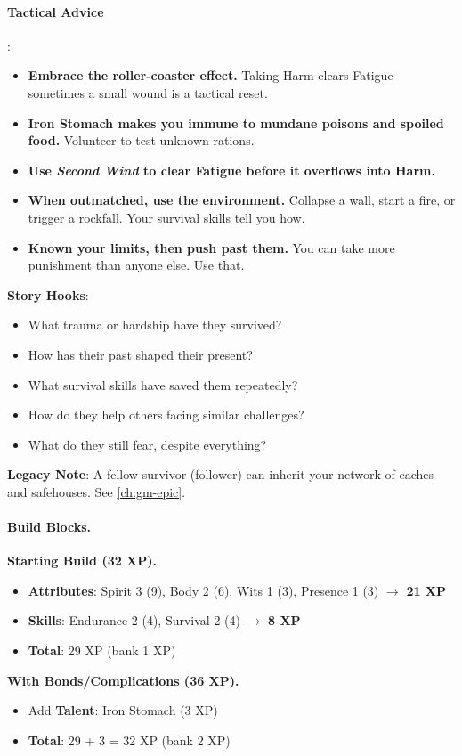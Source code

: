 \paragraph{Tactical Advice}:
\begin{itemize}
\item \textbf{Embrace the roller-coaster effect.} Taking Harm clears Fatigue -- sometimes a small wound is a tactical reset.
\item \textbf{Iron Stomach makes you immune to mundane poisons and spoiled food.} Volunteer to test unknown rations.
\item \textbf{Use \emph{Second Wind} to clear Fatigue before it overflows into Harm.}
\item \textbf{When outmatched, use the environment.} Collapse a wall, start a fire, or trigger a rockfall. Your survival skills tell you how.
\item \textbf{Known your limits, then push past them.} You can take more punishment than anyone else. Use that.
\end{itemize}

\textbf{Story Hooks}:
\begin{itemize}
\item What trauma or hardship have they survived?
\item How has their past shaped their present?
\item What survival skills have saved them repeatedly?
\item How do they help others facing similar challenges?
\item What do they still fear, despite everything?
\end{itemize}

\textbf{Legacy Note}: A fellow survivor (follower) can inherit your network of caches and safehouses. See \ref{ch:gm-epic}.

\paragraph{Build Blocks.}
\textbf{Starting Build (32 XP).}
\begin{itemize}
\item \textbf{Attributes}: Spirit 3 (9), Body 2 (6), Wits 1 (3), Presence 1 (3) \(\rightarrow\) \textbf{21 XP}
\item \textbf{Skills}: Endurance 2 (4), Survival 2 (4) \(\rightarrow\) \textbf{8 XP}
\item \textbf{Total}: 29 XP (bank 1 XP)
\end{itemize}
\textbf{With Bonds/Complications (36 XP).}
\begin{itemize}
\item Add \textbf{Talent}: Iron Stomach (3 XP)
\item \textbf{Total}: 29 + 3 = 32 XP (bank 2 XP)
\end{itemize}

